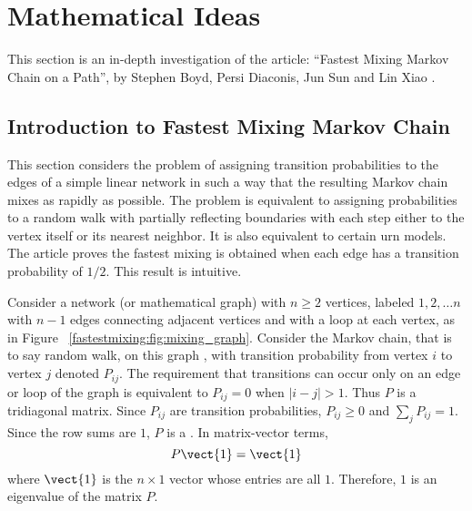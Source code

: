 \documentclass[12pt]{article}
\begin{document}
\hr

\section*{Mathematical Ideas}

This section is an in-depth investigation of the article:  ``Fastest
Mixing Markov Chain on a Path'', by Stephen Boyd, Persi Diaconis, Jun
Sun and Lin Xiao
\cite{doi:10.1080/00029890.2006.11920281}.

\subsection*{Introduction to Fastest Mixing Markov Chain}

This section considers the problem of assigning transition probabilities
to the edges of a simple linear network in such a way that the resulting
Markov chain mixes as rapidly as possible.  The problem is equivalent to
assigning probabilities to a random walk with partially reflecting
boundaries with each step either to the vertex itself or its nearest
neighbor.  It is also equivalent to certain urn models.  The article
proves the fastest mixing is obtained when each edge has a transition
probability of \( 1/2 \).  This result is intuitive.

Consider a network (or mathematical graph) with \( n \ge 2 \) vertices,
labeled \( 1,2, \dots n \) with \( n-1 \) edges connecting adjacent
vertices and with a loop at each vertex, as in Figure~%
\ref{fastestmixing:fig:mixing_graph}.  Consider the Markov chain, that
is to say random walk, on this graph%
%
, with transition probability from vertex \( i \) to vertex \( j \)
denoted \( P_{ij} \).  The requirement that transitions can occur only
on an edge or loop of the graph is equivalent to \( P_{ij} = 0 \) when \(
|i -j| > 1 \).  Thus \( P \) is a tridiagonal matrix.%
Since \( P_{ij} \) are transition probabilities, \( P_{ij} \ge 0 \) and \(
\sum_{j} P_{ij} = 1 \).  Since the row sums are \( 1 \), \( P \) is a
.%
In matrix-vector terms,
\begin{equation}
    P \vect{1} = \vect{1}%
    \label{fastestmixing:eq:eigenvalue_one}
\end{equation}
where \( \vect{1} \) is the \( n \times 1 \) vector whose entries are
all \( 1 \).  Therefore, \( 1 \) is an eigenvalue of the matrix \( P \).
\end{document}
